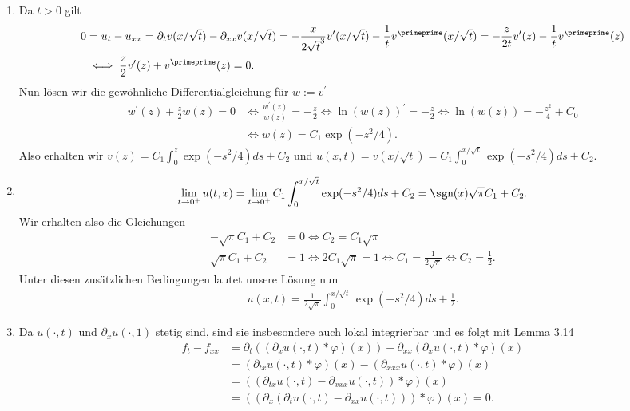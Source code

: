 \begin{solution}
\phantom{}
\begin{enumerate}[label = (\roman*)]
  \item Da $t > 0$ gilt
  \begin{align*}
    0 &= u_t - u_{xx} = \partial_t v(x/\sqrt{t}) - \partial_{xx}v(x/\sqrt{t})
    = -\frac{x}{2\sqrt{t}^3}v^{\prime}(x/\sqrt{t}) - \frac{1}{t}v^{\primeprime}(x/\sqrt{t})
    = - \frac{z}{2t}v^{\prime}(z) - \frac{1}{t}v^{\primeprime}(z) \\
    &\iff \frac{z}{2}v^{\prime}(z) + v^{\primeprime}(z) = 0.
  \end{align*}
  Nun lösen wir die gewöhnliche Differentialgleichung für $w := v^{\prime}$
  \begin{align*}
    w^{\prime}(z) + \frac{z}{2}w(z) = 0 &\iff \frac{w^{\prime}(z)}{w(z)} = -\frac{z}{2}
    \iff \ln(w(z))^{\prime} = -\frac{z}{2} \iff \ln(w(z)) = -\frac{z^2}{4} + C_0 \\
    &\iff w(z) = C_1\exp\left(-z^2/4\right).
  \end{align*}
  Also erhalten wir $v(z) = C_1\int_0^z \exp(-s^2/4) ds + C_2$ und
  $u(x,t) = v(x/\sqrt{t}) = C_1\int_0^{x/\sqrt{t}} \exp(-s^2/4) ds + C_2$.
  \item
  \begin{align*}
    \lim_{t \to 0^+} u(t,x) = \lim_{t \to 0^+} C_1\int_0^{x/\sqrt{t}} \exp(-s^2/4) ds + C_2
    = \sgn(x)\sqrt{\pi}C_1 + C_2.
  \end{align*}
  Wir erhalten also die Gleichungen
  \begin{align*}
    -\sqrt{\pi}C_1 + C_2 &= 0   \iff C_2 = C_1\sqrt{\pi}\\
    \sqrt{\pi}C_1 + C_2 &= 1 \iff 2C_1\sqrt{\pi} = 1 \iff C_1 = \frac{1}{2\sqrt{\pi}}
    \iff C_2 = \frac{1}{2}.
  \end{align*}
  Unter diesen zusätzlichen Bedingungen lautet unsere Lösung nun
  \begin{align*}
    u(x,t) = \frac{1}{2\sqrt{\pi}}\int_0^{x/\sqrt{t}}\exp(-s^2/4)ds + \frac{1}{2}.
  \end{align*}
  \item
  Da $u(\cdot,t)$ und $\partial_x u(\cdot,1)$ stetig sind, sind sie insbesondere
  auch lokal integrierbar und es folgt mit Lemma 3.14
  \begin{align*}
    f_t - f_{xx} &= \partial_t((\partial_x u(\cdot,t)\ast \varphi)(x))
    - \partial_{xx}(\partial_x u(\cdot,t)\ast \varphi)(x) \\
    &= (\partial_{tx} u(\cdot,t) \ast \varphi)(x) - (\partial_{xxx} u(\cdot,t) \ast \varphi)(x) \\
    &= ((\partial_{tx} u(\cdot,t) - \partial_{xxx} u(\cdot,t)) \ast \varphi)(x) \\
    &= ((\partial_{x} (\partial_t u(\cdot,t) - \partial_{xx} u(\cdot,t))) \ast \varphi)(x) = 0.
  \end{align*}


\end{enumerate}
\end{solution}
